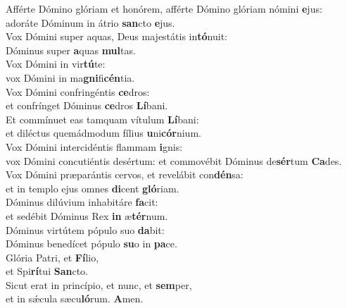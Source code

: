 \evenverse Afférte Dómino glóriam et honórem, afférte Dómino glóriam nómini \textbf{e}jus:~\*\\
\evenverse adoráte Dóminum in átrio \textbf{san}cto \textbf{e}jus.\\
\oddverse Vox Dómini super aquas, Deus majestátis in\textbf{tó}nuit:~\*\\
\oddverse Dóminus super \textbf{a}quas \textbf{mul}tas.\\
\evenverse Vox Dómini in vir\textbf{tú}te:~\*\\
\evenverse vox Dómini in ma\textbf{gni}fi\textbf{cén}tia.\\
\oddverse Vox Dómini confringéntis \textbf{ce}dros:~\*\\
\oddverse et confrínget Dóminus \textbf{ce}dros \textbf{Lí}bani.\\
\evenverse Et commínuet eas tamquam vítulum \textbf{Lí}bani:~\*\\
\evenverse et diléctus quemádmodum fílius \textbf{u}ni\textbf{cór}nium.\\
\oddverse Vox Dómini intercidéntis flammam \textbf{i}gnis:~\*\\
\oddverse vox Dómini concutiéntis desértum: et commovébit Dóminus de\textbf{sér}tum \textbf{Ca}des.\\
\evenverse Vox Dómini præparántis cervos, et revelábit con\textbf{dén}sa:~\*\\
\evenverse et in templo ejus omnes \textbf{di}cent \textbf{gló}riam.\\
\oddverse Dóminus dilúvium inhabitáre \textbf{fa}cit:~\*\\
\oddverse et sedébit Dóminus Rex \textbf{in} æ\textbf{tér}num.\\
\evenverse Dóminus virtútem pópulo suo \textbf{da}bit:~\*\\
\evenverse Dóminus benedícet pópulo \textbf{su}o in \textbf{pa}ce.\\
\oddverse Glória Patri, et \textbf{Fí}lio,~\*\\
\oddverse et Spi\textbf{rí}tui \textbf{San}cto.\\
\evenverse Sicut erat in princípio, et nunc, et \textbf{sem}per,~\*\\
\evenverse et in sǽcula sæcu\textbf{ló}rum. \textbf{A}men.\\
